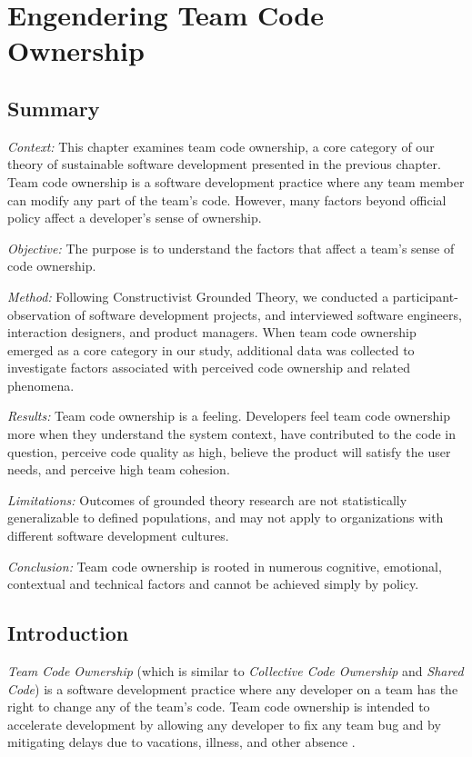 \chapter{Engendering Team Code Ownership}
\label{TeamCodeOwnershipChapter}

\section{Summary}

\textit{Context:} This chapter examines team code ownership, a core category of our theory of sustainable software development presented in the previous chapter. Team code ownership is a software development practice where any team member can modify any part of the team's code. However, many factors beyond official policy affect a developer's sense of ownership. 

\textit{Objective:} The purpose is to understand the factors that affect a team's sense of code ownership.

\textit{Method:} Following Constructivist Grounded Theory, we conducted a \durationOfResearchStudyAdjective{} participant-observation of \numberOfObservedProjects{} software development projects, and interviewed \numberOfInterviews{} software engineers, interaction designers, and product managers.  When team code ownership emerged as a core category in our study, additional data was collected to investigate factors associated with perceived code ownership and related phenomena.

\textit{Results:} Team code ownership is a feeling. Developers feel team code ownership more when they understand the system context, have contributed to the code in question, perceive code quality as high, believe the product will satisfy the user needs, and perceive high team cohesion.  

\textit{Limitations:} Outcomes of grounded theory research are not statistically generalizable to defined populations, and may not apply to organizations with different software development cultures.

\textit{Conclusion:} Team code ownership is rooted in numerous cognitive, emotional, contextual and technical factors and cannot be achieved simply by policy. 

\section{Introduction}
\textit{Team Code Ownership} (which is similar to \textit{Collective Code Ownership} and \textit{Shared Code}) is a software development practice where any developer on a team has the right to change any of the team's code. Team code ownership is intended to accelerate development by allowing any developer to fix any team bug and by mitigating delays due to vacations, illness, and other absence \cite{BeckExtremeProgramming2004}.
 
